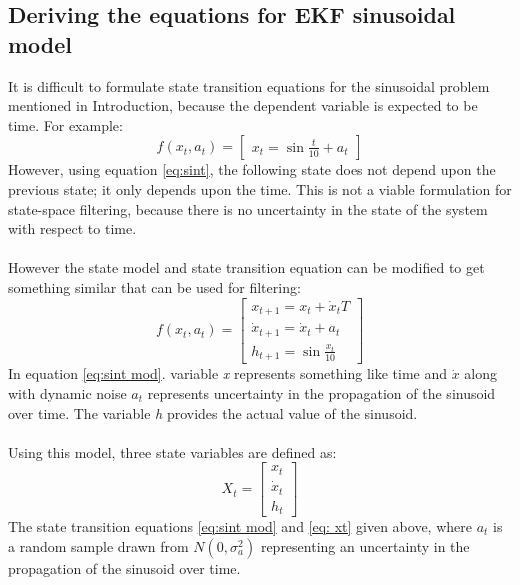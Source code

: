 \documentclass[12pt]{article}
\begin{document}
\subsection{Deriving the equations for EKF sinusoidal model}
\label{sec: derivation}
It is difficult to formulate state transition equations for the sinusoidal problem mentioned in Introduction, because the dependent variable is expected to be time. For example: 
\begin{equation}
f(x_t,a_t) = \begin{bmatrix}
x_t = \sin \frac{t}{10} + a_t
\label{eq:sint}
\end{bmatrix}
\end{equation}
\indent
However, using equation \ref{eq:sint}, the following state does not depend upon the previous state; it only depends upon the time. This is not a viable formulation for state-space filtering, because there is no uncertainty in the state of the system with respect to time. \\
\\ \indent
However the state model and state transition equation can be modified to get something similar that can be used for filtering:
\begin{equation}
f(x_t,a_t) = \begin{bmatrix}
x_{t+1} = x_t + \dot{x}_t T \\
\dot{x}_{t+1} = \dot{x}_t + a_t \\
h_{t+1} = \sin \frac{x_t}{10}
\end{bmatrix}
\label{eq:sint mod}
\end{equation}
\indent
In equation \ref{eq:sint mod}. variable \textit{x} represents something like time and $\dot{x}$ along with dynamic noise $a_t$ represents uncertainty in the propagation of the sinusoid over time. The variable \textit{h} provides the actual value of the sinusoid. \\
\\ \indent
Using this model, three state variables are defined as:
\begin{equation}
X_t = \begin{bmatrix}
x_t \\
\dot{x}_t \\
h_t
\end{bmatrix}
\label{eq: xt}
\end{equation}
\indent
The state transition equations \ref{eq:sint mod} and \ref{eq: xt} given above, where $a_t$ is a random sample drawn from $N(0,\sigma_a^2)$ representing an uncertainty in the propagation of the sinusoid over time. \\
\end{document}
